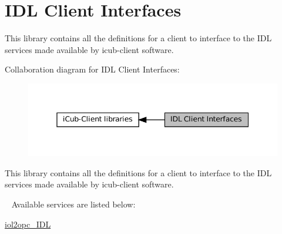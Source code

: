 \hypertarget{group__icubclient__IDLClients}{}\section{I\+DL Client Interfaces}
\label{group__icubclient__IDLClients}


This library contains all the definitions for a client to interface to the I\+DL services made available by icub-\/client software.  


Collaboration diagram for I\+DL Client Interfaces\+:
\nopagebreak
\begin{figure}[H]
\begin{center}
\leavevmode
\includegraphics[width=345pt]{group__icubclient__IDLClients}
\end{center}
\end{figure}
This library contains all the definitions for a client to interface to the I\+DL services made available by icub-\/client software. 

~\newline
Available services are listed below\+: ~\newline

\begin{DoxyItemize}
\item \hyperlink{classiol2opc__IDL}{iol2opc\+\_\+\+I\+DL} 
\end{DoxyItemize}